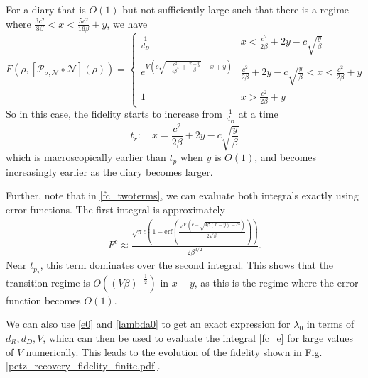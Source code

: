\documentclass[a4paper,11pt]{article}
\newcommand{\be}{\begin{equation}}
\newcommand{\ee}{\end{equation}}
\begin{document}
\begin{enumerate}
\begin{appendix}
For a diary that is $O(1)$ but not sufficiently large such that there is a regime where $\frac{3c^2}{8\beta} < x < \frac{5c^2}{16\beta} +y$, we have 
\be 
F(\rho , [\mathcal{P}_{\sigma,\mathcal{N}}\circ \mathcal{N}](\rho))
= \begin{cases} 
\frac{1}{d_D} & x< \frac{c^2}{2\beta} + 2y - c \sqrt{\frac{y}{\beta}} \\
 e^{V (c \sqrt{-\frac{c^2}{4\beta^2} + \frac{x-y}{\beta}} -x+y )} & \frac{c^2}{2\beta} + 2y - c \sqrt{\frac{y}{\beta}} < x < \frac{c^2}{2\beta} +y\\
 1 & x> \frac{c^2}{2\beta} +y
\end{cases} 
\label{int_fid_2}
\ee
So in this case, the fidelity starts to increase from $\frac{1}{d_D}$ at a time 
\be 
t_r : \quad x = \frac{c^2}{2\beta} + 2y - c \sqrt{\frac{y}{\beta}}
\ee
which is macroscopically earlier than $t_{p}$ when $y$ is $O(1)$, and becomes increasingly earlier as the diary becomes larger. 



Further, note that in \eqref{fc_twoterms}, we can evaluate both integrals exactly using error functions. The first integral is approximately
\begin{align}
F^c \approx \frac{\sqrt{\pi } c \left(1-\text{erf}\left(\frac{\sqrt{V} \left(c-\sqrt{4 \beta 
  (x-y)-c^2}\right)}{2 \sqrt{\beta }}\right)\right)}{2 \beta ^{3/2}}.
\end{align}
Near $t_{p_2}$, this term dominates over the second integral. This shows that the transition regime is $O((V\beta)^{-\frac{1}{2}})$ in $x-y$, as this is the regime where the error function becomes $O(1)$.

 
We can also use \eqref{e0} and \eqref{lambda0} to get an exact expression for $\lambda_0$ in terms of $d_R, d_D, V$, which can then be used to evaluate the integral \eqref{fc_e} for large values of $V$ numerically. This leads to the evolution of the fidelity shown in Fig. \ref{petz_recovery_fidelity_finite.pdf}.



\end{appendix}
\end{enumerate}
\end{document}
